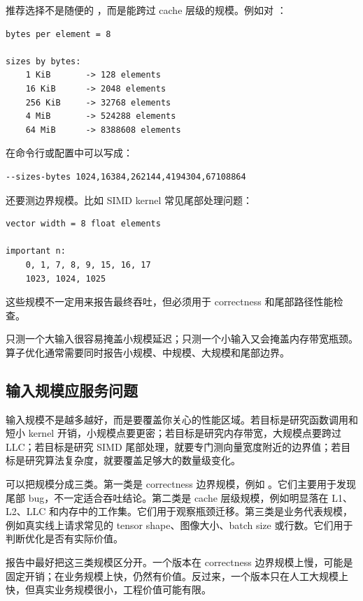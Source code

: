 推荐选择不是随便的 ，而是能跨过 cache 层级的规模。例如对 ：

\begin{lstlisting}
bytes per element = 8

sizes by bytes:
    1 KiB       -> 128 elements
    16 KiB      -> 2048 elements
    256 KiB     -> 32768 elements
    4 MiB       -> 524288 elements
    64 MiB      -> 8388608 elements
\end{lstlisting}

在命令行或配置中可以写成：

\begin{lstlisting}
--sizes-bytes 1024,16384,262144,4194304,67108864
\end{lstlisting}

还要测边界规模。比如 SIMD kernel 常见尾部处理问题：

\begin{lstlisting}
vector width = 8 float elements

important n:
    0, 1, 7, 8, 9, 15, 16, 17
    1023, 1024, 1025
\end{lstlisting}

这些规模不一定用来报告最终吞吐，但必须用于 correctness 和尾部路径性能检查。

\begin{warningbox}
只测一个大输入很容易掩盖小规模延迟；只测一个小输入又会掩盖内存带宽瓶颈。算子优化通常需要同时报告小规模、中规模、大规模和尾部边界。
\end{warningbox}

\subsection{输入规模应服务问题}

输入规模不是越多越好，而是要覆盖你关心的性能区域。若目标是研究函数调用和短小 kernel 开销，小规模点要更密；若目标是研究内存带宽，大规模点要跨过 LLC；若目标是研究 SIMD 尾部处理，就要专门测向量宽度附近的边界值；若目标是研究算法复杂度，就要覆盖足够大的数量级变化。

可以把规模分成三类。第一类是 correctness 边界规模，例如 。它们主要用于发现尾部 bug，不一定适合吞吐结论。第二类是 cache 层级规模，例如明显落在 L1、L2、LLC 和内存中的工作集。它们用于观察瓶颈迁移。第三类是业务代表规模，例如真实线上请求常见的 tensor shape、图像大小、batch size 或行数。它们用于判断优化是否有实际价值。

报告中最好把这三类规模区分开。一个版本在 correctness 边界规模上慢，可能是固定开销；在业务规模上快，仍然有价值。反过来，一个版本只在人工大规模上快，但真实业务规模很小，工程价值可能有限。

